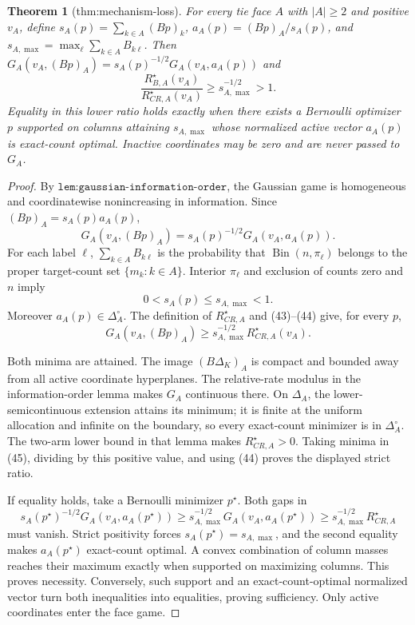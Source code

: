 \documentclass{article}
\newtheorem{theorem}{Theorem}
\begin{document}
\begin{theorem}[thm:mechanism-loss]\label{thm:mechanism-loss}
For every tie face \(A\) with \(|A|\geq2\) and positive \(v_A\), define \(s_A(p)=\sum_{k\in A}(Bp)_k\), \(a_A(p)=(Bp)_A/s_A(p)\), and \(s_{A,\max}=\max_\ell\sum_{k\in A}B_{k\ell}\). Then \(G_A(v_A,(Bp)_A)=s_A(p)^{-1/2}G_A(v_A,a_A(p))\) and \[\frac{R_{B,A}^\star(v_A)}{R_{CR,A}^\star(v_A)}\geq s_{A,\max}^{-1/2}>1.\] Equality in this lower ratio holds exactly when there exists a Bernoulli optimizer \(p\) supported on columns attaining \(s_{A,\max}\) whose normalized active vector \(a_A(p)\) is exact-count optimal. Inactive coordinates may be zero and are never passed to \(G_A\).
\end{theorem}
\begin{proof}
By \(\texttt{lem:gaussian-information-order}\), the Gaussian game is homogeneous and coordinatewise nonincreasing in information.  Since \((Bp)_A=s_A(p)a_A(p)\),
\[
G_A(v_A,(Bp)_A)=s_A(p)^{-1/2}G_A(v_A,a_A(p)). \tag{43}
\]
For each label \(\ell\), \(\sum_{k\in A}B_{k\ell}\) is the probability that \(\operatorname{Bin}(n,\pi_\ell)\) belongs to the proper target-count set \(\{m_k:k\in A\}\).  Interior \(\pi_\ell\) and exclusion of counts zero and \(n\) imply
\[
0<s_A(p)\leq s_{A,\max}<1. \tag{44}
\]
Moreover \(a_A(p)\in\Delta_A^\circ\).  The definition of \(R_{CR,A}^\star\) and (43)--(44) give, for every \(p\),
\[
G_A(v_A,(Bp)_A)\geq s_{A,\max}^{-1/2}R_{CR,A}^\star(v_A). \tag{45}
\]

Both minima are attained.  The image \((B\Delta_K)_A\) is compact and bounded away from all active coordinate hyperplanes.  The relative-rate modulus in the information-order lemma makes \(G_A\) continuous there.  On \(\Delta_A\), the lower-semicontinuous extension attains its minimum; it is finite at the uniform allocation and infinite on the boundary, so every exact-count minimizer is in \(\Delta_A^\circ\).  The two-arm lower bound in that lemma makes \(R_{CR,A}^\star>0\).  Taking minima in (45), dividing by this positive value, and using (44) proves the displayed strict ratio.

If equality holds, take a Bernoulli minimizer \(p^\star\).  Both gaps in
\[
s_A(p^\star)^{-1/2}G_A(v_A,a_A(p^\star))
\geq s_{A,\max}^{-1/2}G_A(v_A,a_A(p^\star))
\geq s_{A,\max}^{-1/2}R_{CR,A}^\star
\]
must vanish.  Strict positivity forces \(s_A(p^\star)=s_{A,\max}\), and the second equality makes \(a_A(p^\star)\) exact-count optimal.  A convex combination of column masses reaches their maximum exactly when supported on maximizing columns.  This proves necessity.  Conversely, such support and an exact-count-optimal normalized vector turn both inequalities into equalities, proving sufficiency.  Only active coordinates enter the face game.
\end{proof}
\end{document}
